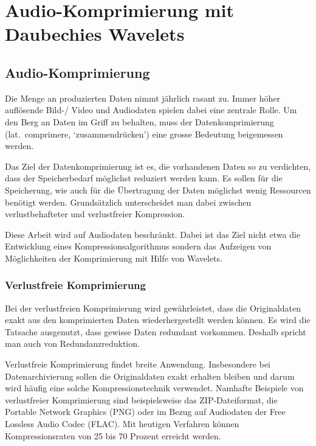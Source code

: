 %
%
%
\chapter{Audio-Komprimierung mit Daubechies Wavelets\label{chapter:compress}}
\begin{refsection}

\section{Audio-Komprimierung}
Die Menge an produzierten Daten nimmt jährlich rasant zu.
Immer höher auflösende Bild-/ Video und Audiodaten spielen dabei eine zentrale Rolle.
Um den Berg an Daten im Griff zu behalten, muss der Datenkomprimierung (lat.~comprimere, `zusammendrücken') eine grosse Bedeutung beigemessen werden. 

Das Ziel der Datenkomprimierung ist es, die vorhandenen Daten so zu verdichten, dass der Speicherbedarf möglichst reduziert werden kann.
Es sollen für die Speicherung, wie auch für die Übertragung der Daten möglichst wenig Ressourcen benötigt werden.
Grundsätzlich unterscheidet man dabei zwischen verlustbehafteter und verlustfreier Kompression.

Diese Arbeit wird auf Audiodaten beschränkt.
Dabei ist das Ziel nicht etwa die Entwicklung eines Kompressionsalgorithmus sondern das Aufzeigen von Möglichkeiten der Komprimierung mit Hilfe von Wavelets.

\subsection{Verlustfreie Komprimierung}
Bei der verlustfreien Komprimierung wird gewährleistet, dass die Originaldaten exakt aus den komprimierten Daten wiederhergestellt werden können.
Es wird die Tatsache ausgenutzt, dass gewisse Daten redundant vorkommen. 
Deshalb spricht man auch von Redundanzreduktion.

Verlustfreie Komprimierung findet breite Anwendung.
Insbesondere bei Datenarchivierung sollen die Originaldaten exakt erhalten bleiben und darum wird häufig eine solche Kompressionstechnik verwendet.
Namhafte Beispiele von verlustfreier Komprimierung sind beispielsweise das ZIP-Dateiformat, die Portable Network Graphics (PNG) oder im Bezug auf Audiodaten der Free Lossless Audio Codec (FLAC).
Mit heutigen Verfahren können Kompressionsraten von 25 bis 70 Prozent erreicht werden.


\end{refsection}
